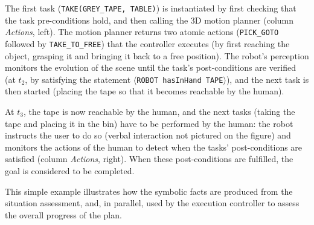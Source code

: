 \documentclass[preprint,3p,times]{elsarticle}
\newcommand{\stmt}[1]{{\footnotesize\tt$\langle$#1\relax$\rangle$}}
\begin{document}
The first task ({\tt TAKE(GREY\_TAPE, TABLE)}) is instantiated by first checking
that the task pre-conditions hold, and then calling the 3D motion planner
(column \emph{Actions}, left). The motion planner returns two atomic actions
({\tt PICK\_GOTO} followed by {\tt TAKE\_TO\_FREE}) that the controller executes
(by first reaching the object, grasping it and bringing it back to a free
position).  The robot's perception monitors the evolution of the scene until the
task's post-conditions are verified (at $t_2$, by satisfying the statement
\stmt{ROBOT hasInHand TAPE}), and the next task is then started (placing the
tape so that it becomes reachable by the human).

At $t_3$, the tape is now reachable by the human, and the next tasks (taking the
tape and placing it in the bin) have to be performed by the human: the robot
instructs the user to do so (verbal interaction not pictured on the figure) and
monitors the actions of the human to detect when the tasks' post-conditions are
satisfied (column \emph{Actions}, right). When these post-conditions are
fulfilled, the goal is considered to be completed.

This simple example illustrates how the symbolic facts are produced from the
situation assessment, and, in parallel, used by the execution controller to
assess the overall progress of the plan.
\end{document}
